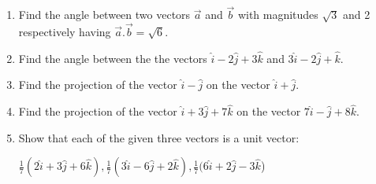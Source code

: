 \begin{enumerate}[label=\thesection.\arabic*,ref=\thesection.\theenumi]
\item Find the angle between two vectors $\overrightarrow{a}$ and $\overrightarrow {b} $ with magnitudes $\sqrt{3}$ and 2 respectively having $\overrightarrow {a}.\overrightarrow {b}=\sqrt{6}$.
	\\
	\solution
		
\item Find the angle between the the vectors $\hat{i}-2\hat{j}+3\hat{k}$ and $3\hat{i}-2\hat{j}+\hat{k}$.
	\\
	\solution
		
\item Find the projection of the vector $\hat{i}-\hat{j}$ on the vector $\hat{i}+\hat{j}$.
	\\
		
\item Find the projection of the vector $\hat{i}+3\hat{j}+7\hat{k}$ on the vector $7\hat{i}-\hat{j}+8\hat{k}$.
	\\
	\solution
		
\item Show that each of the given three vectors is a unit vector: 

 $\frac{1}{7}(2\hat{i}+3\hat{j}+6\hat{k}),\frac{1}{7}(3\hat{i}-6\hat{j}+2\hat{k}),\frac{1}{7}(6\hat{i}+2\hat{j}-3\hat{k}$)
 

\end{enumerate}
